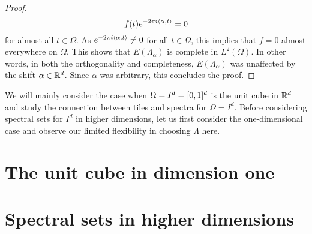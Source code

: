 \documentclass[../thesis.tex]{subfiles}
\begin{document}
\begin{proof}
    \begin{equation*}
        f(t) e^{-2 \pi i \langle\alpha, t\rangle} = 0
    \end{equation*}
    for almost all $t \in \Omega$. As $e^{-2 \pi i \langle\alpha, t\rangle} \neq 0$ for all $t\in \Omega$, this implies that $f = 0$ almost everywhere on $\Omega$. This shows that $E(\Lambda_\alpha)$ is complete in $L^2(\Omega)$. In other words, in both the orthogonality and completeness, $E(\Lambda_\alpha)$ was unaffected by the shift $\alpha \in \mathbb{R}^d$. Since $\alpha$ was arbitrary, this concludes the proof. 
\end{proof}

We will mainly consider the case when $\Omega=I^d=[0,1]^d$ is the unit cube in $\mathbb{R}^d$ and study the connection between tiles and spectra for $\Omega=I^d$. Before considering spectral sets for $I^d$ in higher dimensions, let us first consider the one-dimensional case and observe our limited flexibility in choosing $\Lambda$ here.

\section{The unit cube in dimension one}\label{sec:complx_trig_1d}
    





\section{Spectral sets in higher dimensions}\label{sec:spec_higher_dim}
    
\end{document}
